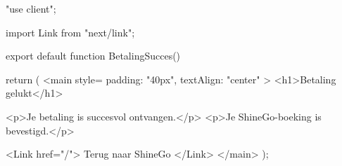 "use client";

import Link from "next/link";

export default function BetalingSucces() {
  return (
    <main style={{ padding: "40px", textAlign: "center" }}>
      <h1>Betaling gelukt</h1>

      <p>Je betaling is succesvol ontvangen.</p>
      <p>Je ShineGo-boeking is bevestigd.</p>

      <Link href="/">
        Terug naar ShineGo
      </Link>
    </main>
  );
}